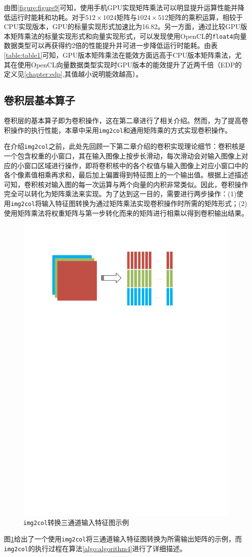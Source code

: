 由图\ref{figure:figure9}可知，使用手机GPU实现矩阵乘法可以明显提升运算性能并降低运行时能耗和功耗。对于$512\times1024$矩阵与$1024\times512$矩阵的乘积运算，相较于CPU实现版本，GPU的标量实现形式加速比为16.82。另一方面，通过比较GPU版本矩阵乘法的标量实现形式和向量实现形式，可以发现使用OpenCL的\texttt{float4}向量数据类型可以再获得约2倍的性能提升并可进一步降低运行时能耗。由表\ref{table:table1}可知，GPU版本矩阵乘法在能效方面远高于CPU版本矩阵乘法，尤其在使用OpenCL向量数据类型实现时GPU版本的能效提升了近两千倍（EDP的定义见\ref{chapter:edp},其值越小说明能效越高）。

\subsection{卷积层基本算子}

卷积层的基本算子即为卷积操作，这在第二章进行了相关介绍。然而，为了提高卷积操作的执行性能，本章中采用\texttt{img2col}和通用矩阵乘的方式实现卷积操作。

在介绍\texttt{img2col}之前，此处先回顾一下第二章介绍的卷积实现理论细节：卷积核是一个包含权重的小窗口，其在输入图像上按步长滑动，每次滑动会对输入图像上对应的小窗口区域进行操作，即将卷积核中的各个权值与输入图像上对应小窗口中的各个像素值相乘再求和，最后加上偏置得到特征图上的一个输出值。根据上述描述可知，卷积核对输入图的每一次运算与两个向量的内积非常类似。因此，卷积操作完全可以转化为矩阵乘法来实现。为了达到这一目的，需要进行两步操作：(1)使用\texttt{img2col}将输入特征图转换为通过矩阵乘法实现卷积操作时所需的矩阵形式；(2)使用矩阵乘法将权重矩阵与第一步转化而来的矩阵进行相乘以得到卷积输出结果。

\begin{figure}[htb]
    \begin{center}
    \includegraphics[height=0.25\textwidth]{figures/im2col.pdf}
    \end{center}
    \caption{\texttt{img2col}转换三通道输入特征图示例}\label{figure:figure10}
\end{figure}

图\ref{figure:figure10}给出了一个使用\texttt{img2col}将三通道输入特征图转换为所需输出矩阵的示例，而\texttt{img2col}的执行过程在算法\ref{algo:algorithm4}进行了详细描述。


